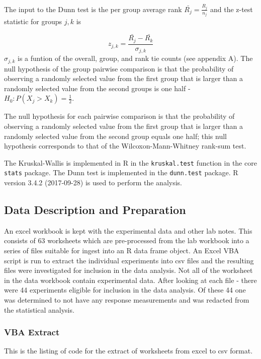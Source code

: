 \documentclass[12pt,]{article}
\begin{document}
The input to the Dunn test is the per group average rank
\(\bar{R_j} = \frac{R_j}{n_j}\) and the z-test statistic for groups
\(j,k\) is

\[z_{j,k} = \frac{\bar{R_j} - \bar{R_k}}{\sigma_{j,k}}\]
\(\sigma_{j,k}\) is a funtion of the overall, group, and rank tie counts
(see appendix A). The null hypothesis of the group pairwise comparison
is that the probability of observing a randomly selected value from the
first group that is larger than a randomly selected value from the
second groups is one half - \(H_0 : P(X_j > X_k) = \frac{1}{2}\).

The null hypothesis for each pairwise comparison is that the probability
of observing a randomly selected value from the first group that is
larger than a randomly selected value from the second group equals one
half; this null hypothesis corresponds to that of the
Wilcoxon-Mann-Whitney rank-sum test.

The Kruskal-Wallis is implemented in R in the \texttt{kruskal.test}
function in the core \texttt{stats} package. The Dunn test is
implemented in the \texttt{dunn.test} package. R version 3.4.2
(2017-09-28) is used to perform the analysis.

\subsection{Data Description and
Preparation}\label{data-description-and-preparation}

An excel workbook is kept with the experimental data and other lab
notes. This consists of 63 worksheets which are pre-processed from the
lab workbook into a series of files suitable for ingest into an R data
frame object. An Excel VBA script is run to extract the individual
experiments into csv files and the resulting files were investigated for
inclusion in the data analysis. Not all of the worksheet in the data
workbook contain experimental data. After looking at each file - there
were 44 experiments eligible for inclusion in the data analysis. Of
these 44 one was determined to not have any response measurements and
was redacted from the statistical analysis.

\subsubsection{VBA Extract}\label{vba-extract}

This is the listing of code for the extract of worksheets from excel to
csv format.
\end{document}
